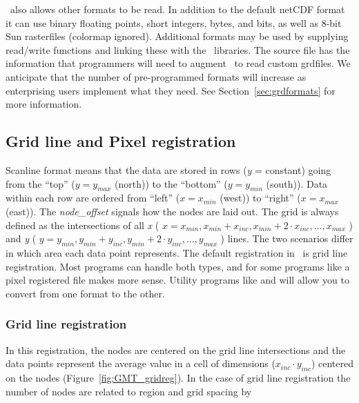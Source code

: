 
\GMT\ also allows other formats to be read.  In addition to
the default netCDF format it can use binary floating points, short
integers, bytes, and bits, as well as 8-bit Sun rasterfiles (colormap
ignored).   Additional formats may be used by supplying read/write
functions and linking these with the \GMT\ libraries.
The source file  has the information that
programmers will need to augment \GMT\ to read custom grdfiles.  We
anticipate that the number of pre-programmed formats will increase as
enterprising users implement what they need.  See Section~\ref{sec:grdformats}
for more information.

\subsection{Grid line and Pixel registration} 

Scanline format means that the data are stored in rows ({\it y} = constant)
going from the ``top'' ($y = y_{max}$ (north)) to the ``bottom''
($y = y_{min}$ (south)).  Data within each row are ordered from
``left'' ($x = x_{min}$ (west)) to ``right'' ($x = x_{max}$
(east)).  The {\it node\_offset} signals how the nodes are laid out.
The grid is always defined as the intersections of all {\it x}
( \( x = x_{min}, x_{min} + x_{inc}, x_{min} + 2 \cdot x_{inc}, \ldots, x_{max} \) )
and {\it y} ( \( y = y_{min}, y_{min} + y_{inc}, y_{min} + 2 \cdot y_{inc}, \ldots, y_{max} \) )
lines.  The two scenarios differ in which area each data point
represents.
The default registration in \GMT\ is grid line registration.  Most
programs can handle both types, and for some programs like 
a pixel registered file makes more sense.  Utility programs like
 and  will allow you to convert
from one format to the other.

\subsubsection{Grid line registration}

In this registration, the nodes are centered on the grid line
intersections and the data points represent the average value
in a cell of dimensions ($x_{inc} \cdot y_{inc}$) centered on the
nodes (Figure~\ref{fig:GMT_gridreg}).
In the case of grid line registration the number of nodes are
related to region and grid spacing by \\

